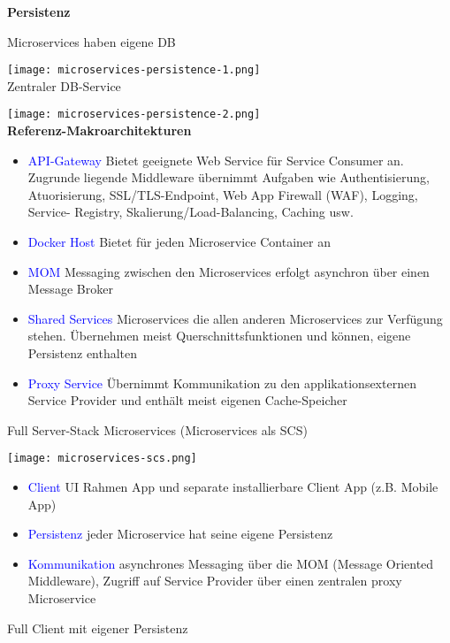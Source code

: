 \textbf{Persistenz}

Microservices haben eigene DB

\texttt{[image: microservices-persistence-1.png]} \\

Zentraler DB-Service

\texttt{[image: microservices-persistence-2.png]} \\

\textbf{Referenz-Makroarchitekturen}

\begin{itemize}
    \item \textcolor{blue}{API-Gateway} Bietet geeignete Web Service für Service Consumer an. Zugrunde liegende Middleware übernimmt Aufgaben wie Authentisierung, Atuorisierung, SSL/TLS-Endpoint, Web App Firewall (WAF), Logging, Service-
        Registry, Skalierung/Load-Balancing, Caching usw.
    \item \textcolor{blue}{Docker Host} Bietet für jeden Microservice Container an
    \item \textcolor{blue}{MOM} Messaging zwischen den Microservices erfolgt asynchron über einen Message Broker
    \item \textcolor{blue}{Shared Services} Microservices die allen anderen Microservices zur Verfügung stehen. Übernehmen meist Querschnittsfunktionen und können, eigene Persistenz enthalten
    \item \textcolor{blue}{Proxy Service} Übernimmt Kommunikation zu den applikationsexternen Service Provider und enthält meist eigenen Cache-Speicher
\end{itemize}

Full Server-Stack Microservices (Microservices als SCS)

\texttt{[image: microservices-scs.png]}

\begin{itemize}
    \item \textcolor{blue}{Client} UI Rahmen App und separate installierbare Client App (z.B. Mobile App)
    \item \textcolor{blue}{Persistenz} jeder Microservice hat seine eigene Persistenz
    \item \textcolor{blue}{Kommunikation} asynchrones Messaging über die MOM (Message Oriented Middleware), Zugriff auf Service Provider über einen zentralen proxy Microservice
\end{itemize}
\vspace{10pt}
\vfill\null
\columnbreak
Full Client mit eigener Persistenz

